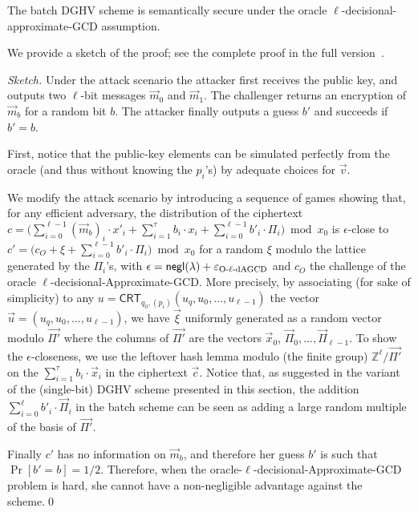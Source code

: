 \documentclass{llncs}
\newcommand{\Z}{{\mathbb Z}}
\newcommand*{\crt}{\ensuremath{\mathsf{CRT}}}
\begin{document}
\begin{theorem}\label{thm:l-dAGC}
The batch DGHV scheme is semantically secure under the
oracle $\ell$-decisional-approximate-GCD assumption.
\end{theorem}

We provide a sketch of the proof; see the complete proof in the full version~\cite{CLT2013a}.
\begin{proof}[Sketch]
Under the attack scenario the attacker first receives the public key, and outputs two $\ell$-bit messages $\vec m_0$ and $\vec m_1$. The challenger returns an encryption of $\vec m_b$ for a random bit $b$. The attacker finally outputs a guess $b'$ and succeeds if $b' = b$.

First, notice that the public-key elements can be simulated perfectly from the oracle 
(and thus without knowing the $p_i$'s) by adequate choices for $\vec v$.

We modify the attack scenario by introducing a sequence of games showing that,
for any efficient adversary, the distribution of the ciphertext $c=\big(
\sum_{i=0}^{\ell-1}(\vec m_b)_i\cdot x'_i+\sum_{i=1}^\tau b_i\cdot
x_i+\sum_{i=0}^{\ell-1}b'_i \cdot \varPi_i\big)\bmod x_0$ is
$\epsilon$-close to $c'=\big(c_O+\xi+\sum_{i=0}^{\ell-1}b'_i\cdot \varPi_i\big)\bmod
x_0$ for a random $\xi$ modulo the lattice generated by the $\varPi_i$'s, with
$\epsilon = {\sf negl}(\lambda)+\varepsilon_{\text{O-$\ell$-dAGCD}}$ and $c_O$
the challenge of the oracle $\ell$-decisional-Approximate-GCD. More precisely,
by associating (for sake of simplicity) to any $u=\crt_{q_0,(p_i)}(u_q,u_0,\ldots,u_{\ell-1})$ the
vector $\vec u=(u_q,u_0,\ldots,u_{\ell-1})$, we have $\vec \xi$ uniformly generated
as a random vector modulo $\vec{\Pi'}$ where the columns of $\vec{\Pi'}$ are
the vectors $\vec x_0$, $\vec \varPi_0,\ldots,\vec\varPi_{\ell-1}$. To show
the $\epsilon$-closeness, we use the leftover hash lemma modulo (the finite group) $\Z^\ell/\vec{\Pi'}$
on the $\sum_{i=1}^\tau b_i\cdot \vec x_i$ in the ciphertext $\vec c$. Notice that, as suggested in the variant of the (single-bit) DGHV scheme presented in this section, the addition $\sum_{i=0}^\ell b'_i\cdot \vec\varPi_i$ in the batch scheme can be seen as adding a large random multiple of the basis of $\vec {\Pi'}$.

Finally $c'$ has no information on $\vec m_b$, and therefore her guess $b'$ 
is such that $\Pr[b'=b]=1/2$. Therefore, when the oracle-$\ell$-decisional-Approximate-GCD 
problem is hard, she cannot have a non-negligible advantage against the scheme.\qed\end{proof}
\end{document}
